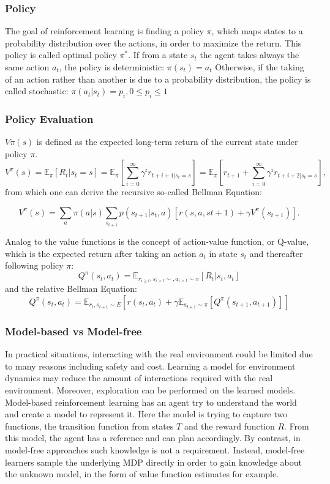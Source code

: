 \subsubsection{Policy}
The goal of reinforcement learning is finding a policy \(\pi\), which maps states to a probability distribution over the actions, in order to maximize the return. This policy is called optimal policy \(\pi^*\).
If from a state \(s_t\) the agent takes always the same action \(a_t\), the policy is deterministic:
\(\pi(s_t) = a_t\)
Otherwise, if the taking of an action rather than another is due to a probability distribution, the policy is called stochastic:
\(\pi(a_t|s_t) = p_i, 0 \leq p_i \leq 1\)


\subsubsection{Policy Evaluation}
$V\pi(s)$ is defined as the expected long-term return of the current state under policy $\pi$. 
\[V^\pi(s) = \mathbb{E}_\pi{\left[R_t|s_t=s\right]}= \mathbb{E}_\pi\left[\sum^{\infty}_{i=0}\gamma^ir_{t+i+1|s_t=s}\right] = \mathbb{E}_\pi\left[r_{t+1} + \sum^{\infty}_{i=0}\gamma^ir_{t+i+2|s_t=s}\right],\]
from which one can derive the recursive so-called Bellman Equation:

\[V^\pi(s) = \sum_a\pi(a|s)\sum_{s_{t+1}}p(s_{t+1}|s_t,a)[r(s,a,s{t+1})+\gamma V^\pi(s_{t+1})].\]

Analog to the value functions is the concept of action-value function, or Q-value, which is the expected return after taking an action \(a_t\) in state \(s_t\) and thereafter following policy \(\pi\):
\[Q^\pi(s_t,a_t)=\mathbb{E}_{r_{i \geq t},s_{i>t} \sim ,a_{i>t} \sim \pi}[R_t|s_t,a_t]\]
and the relative Bellman Equation:
\[Q^\pi(s_t,a_t)=\mathbb{E}_{r_t,s_{t+1} \sim E }\left[ r(s_t,a_t) + \gamma \mathbb{E}_{a_{t+1} \sim \pi}\left[Q^\pi (s_{t+1},a_{t+1})\right]\right]\]


\subsubsection{Model-based vs Model-free}
In practical situations, interacting with the real environment could be limited due to many reasons including safety and cost. Learning a model for environment dynamics may reduce the amount of interactions required with the real environment. Moreover, exploration can be performed on the learned models.
Model-based reinforcement learning has an agent try to understand the world and create a model to represent it. Here the model is trying to capture two functions, the transition function from states $T$ and the reward function $R$. From this model, the agent has a reference and can plan accordingly.
By contrast, in model-free approaches such knowledge is not a requirement. Instead, model-free learners sample the underlying MDP directly in order to gain knowledge about the unknown model, in the form of value function estimates for example. 



